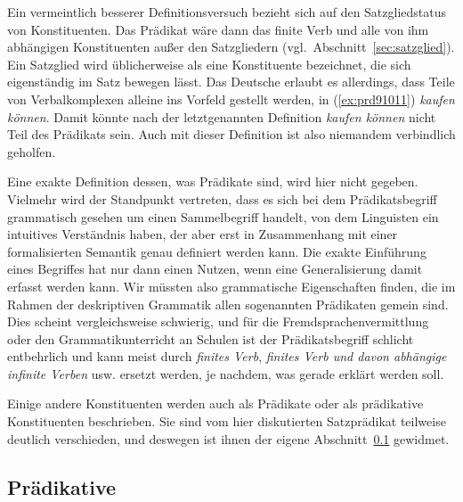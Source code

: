 
\label{abs:satzgliedfail}Ein vermeintlich besserer Definitionsversuch bezieht sich auf den Satzgliedstatus von Konstituenten.
Das Prädikat wäre dann das finite Verb und alle von ihm abhängigen Konstituenten außer den Satzgliedern (vgl.\ Abschnitt~\ref{sec:satzglied}).
Ein Satzglied wird üblicherweise als eine Konstituente bezeichnet, die sich eigenständig im Satz bewegen lässt.
Das Deutsche erlaubt es allerdings, dass Teile von Verbalkomplexen alleine ins Vorfeld gestellt werden, in (\ref{ex:prd91011}) \zB \textit{kaufen können}.
Damit könnte nach der letztgenannten Definition \textit{kaufen können} nicht Teil des Prädikats sein.
Auch mit dieser Definition ist also niemandem verbindlich geholfen.

\begin{exe}
\end{exe}

Eine exakte Definition dessen, was Prädikate sind, wird hier nicht gegeben.
Vielmehr wird der Standpunkt vertreten, dass es sich bei dem Prädikatsbegriff grammatisch gesehen um einen Sammelbegriff handelt, von dem Linguisten ein intuitives Verständnis haben, der aber erst in Zusammenhang mit einer formalisierten Semantik genau definiert werden kann.
Die exakte Einführung eines Begriffes hat nur dann einen Nutzen, wenn eine Generalisierung damit erfasst werden kann.
Wir müssten also grammatische Eigenschaften finden, die im Rahmen der deskriptiven Grammatik allen sogenannten Prädikaten gemein sind.
Dies scheint vergleichsweise schwierig, und für die Fremdsprachenvermittlung oder den Grammatikunterricht an Schulen ist der Prädikatsbegriff schlicht entbehrlich und kann meist durch \textit{finites Verb}, \textit{finites Verb und davon abhängige infinite Verben} usw. ersetzt werden, je nachdem, was gerade erklärt werden soll.

Einige andere Konstituenten werden auch als Prädikate oder als prädikative Konstituenten beschrieben.
Sie sind vom hier diskutierten Satzprädikat teilweise deutlich verschieden, und deswegen ist ihnen der eigene Abschnitt~\ref{sec:praedikative} gewidmet.

\subsection{Prädikative}

\label{sec:praedikative}


